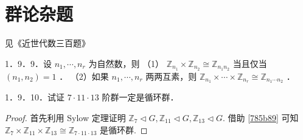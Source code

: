 \section{群论杂题}

见《近世代数三百题》

\begin{proposition}
1．9．9．设 $n_1, \cdots, n_r$ 为自然数，则
（1） $\mathbb{Z}_{n_1} \times \mathbb{Z}_{n_2} \cong \mathbb{Z}_{n_1 n_2}$ 当且仅当 $\left(n_1, n_2\right)=1$ ．
（2）如果 $n_1, \cdots, n_r$ 两两互素，则 $\mathbb{Z}_{n_1} \times \cdots \times \mathbb{Z}_{n_r} \cong \mathbb{Z}_{n_1 \cdots n_2}$ ．\label{785b89}
\end{proposition}

\begin{proposition}
1．9．10．试证 $7 \cdot 11 \cdot 13$ 阶群一定是循环群．
\end{proposition}
\begin{proof}
首先利用 Sylow 定理证明 $\mathbb{Z}_{7}\lhd G,\mathbb{Z}_{11}\lhd G,\mathbb{Z}_{13}\lhd G$. 借助 \cref{785b89} 可知 $\mathbb{Z}_{7}\times \mathbb{Z}_{11}\times \mathbb{Z}_{13}\cong \mathbb{Z}_{7\cdot11\cdot13}$ 是循环群.
\end{proof}


